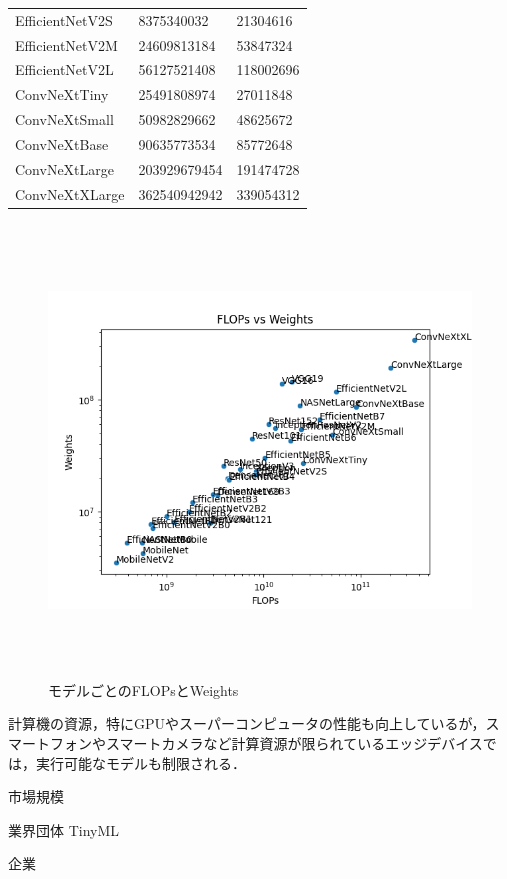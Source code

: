 \begin{table}[H]
\begin{tabular}{lll}
		EfficientNetV2S & 8375340032 & 21304616 \\ 
		EfficientNetV2M & 24609813184 & 53847324 \\ 
		EfficientNetV2L & 56127521408 & 118002696 \\ 
		ConvNeXtTiny & 25491808974 & 27011848 \\ 
		ConvNeXtSmall & 50982829662 & 48625672 \\ 
		ConvNeXtBase & 90635773534 & 85772648 \\ 
		ConvNeXtLarge & 203929679454 & 191474728 \\ 
		ConvNeXtXLarge & 362540942942 & 339054312 \\ 
		\hline
	\end{tabular}
\end{table}

\begin{figure} [H]
	\begin{center}
		\includegraphics[clip, height=12cm, bb=-60 0 640 480]{data/figure/models_info.png}
		\caption{モデルごとのFLOPsとWeights}
		\label{flops_vs_weights}
	\end{center}
\end{figure}


計算機の資源，特にGPUやスーパーコンピュータの性能も向上しているが，スマートフォンやスマートカメラなど計算資源が限られているエッジデバイスでは，実行可能なモデルも制限される．

市場規模

業界団体
	TinyML

企業

